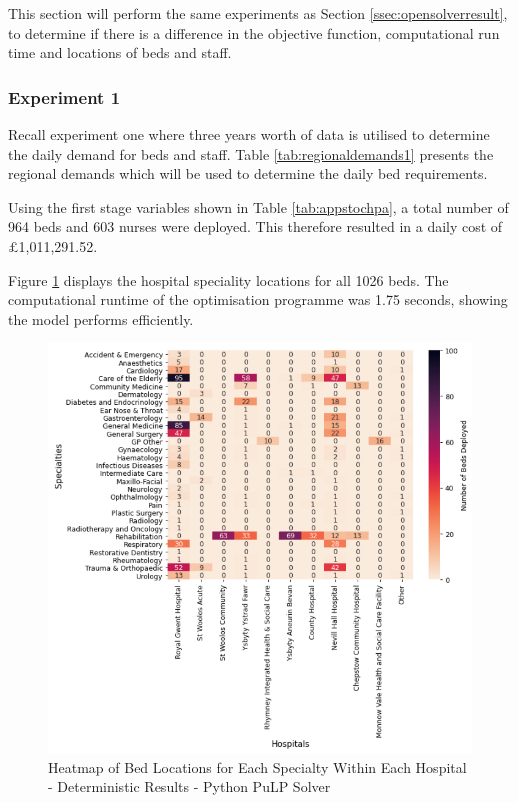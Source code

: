 \documentclass[../thesis.tex]{subfiles}
\begin{document}
This section will perform the same experiments as Section \ref{ssec:opensolverresult}, to determine if there is a difference in the objective function, computational run time and locations of beds and staff.

\subsubsection{Experiment 1}
Recall experiment one where three years worth of data is utilised to determine the daily demand for beds and staff. Table \ref{tab:regionaldemands1} presents the regional demands which will be used to determine the daily bed requirements.


Using the first stage variables shown in Table \ref{tab:appstochpa}, a total number of 964 beds and 603 nurses were deployed. This therefore resulted in a daily cost of $\pounds$1,011,291.52.

Figure \ref{fig:pythondet1} displays the hospital speciality locations for all 1026 beds. The computational runtime of the optimisation programme was 1.75 seconds, showing the model performs efficiently.


\begin{figure}[h!]
    \centering
    \includegraphics{Chapters/Chapter5/Figures/exdet.png}
    \caption{Heatmap of Bed Locations for Each Specialty Within Each Hospital - Deterministic Results - Python PuLP Solver}
    \label{fig:pythondet1}
\end{figure}
\end{document}
